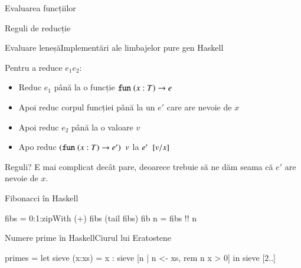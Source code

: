 \documentclass[xcolor=pdftex,romanian,colorlinks]{beamer}
\begin{document}
\begin{section}{Evaluarea funcțiilor}
\begin{subsection}{Reguli de reducție}
\begin{frame}{Evaluare leneșă}{Implementări ale limbajelor pure gen Haskell}
\begin{block}{}
Pentru a reduce $e_1 \mathrel{} e_2$:
\begin{itemize}
\item  Reduc $e_1$ până la o funcție
$\mathrel{\text{\ttfamily fun}} (x : T) \rightarrow e$
\item Apoi reduc corpul funcției  până la un $e'$ care are nevoie de $x$
\item Apoi reduc $e_2$ până la o valoare $v$
\item Apo reduc $(\mathrel{\text{\ttfamily fun}} (x : T) \rightarrow e')\mathrel{} v$ la $e'\mathrel{}[v/x]$
\end{itemize}
\end{block}
\begin{block}{Reguli?}
E mai complicat decât pare, deoarece trebuie să ne dăm seama că $e'$ are nevoie de $x$.
\end{block}

\end{frame}

\begin{frame}[fragile]{Fibonacci în Haskell}
\begin{asciimaude}
fibs = 0:1:zipWith (+) fibs (tail fibs)
fib n = fibs !! n
\end{asciimaude}
\end{frame}

\begin{frame}[fragile]{Numere prime în Haskell}{Ciurul lui Eratostene}
\begin{asciimaude}
primes = let { sieve (x:xs) = x : sieve [n | n <- xs, rem n x > 0] } 
           in sieve [2..] 
\end{asciimaude}
\end{frame}

\end{subsection}

%
%
\end{section}
\end{document}
